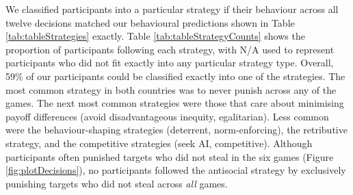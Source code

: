\documentclass[
  man,floatsintext]{apa6}
\begin{document}
We classified participants into a particular strategy if their behaviour across
all twelve decisions matched our behavioural predictions shown in Table
\ref{tab:tableStrategies} exactly. Table \ref{tab:tableStrategyCounts} shows
the proportion of participants following each strategy, with N/A used to
represent participants who did not fit exactly into any particular strategy type.
Overall, 59\%
of our participants could be classified exactly into one of the strategies. The
most common strategy in both countries was to never punish across any of the
games. The next most common strategies were those that care about
minimising payoff differences (avoid disadvantageous inequity, egalitarian).
Less common were the behaviour-shaping strategies (deterrent, norm-enforcing),
the retributive strategy, and the competitive strategies (seek AI, competitive).
Although participants often punished targets who did not steal
in the six games (Figure \ref{fig:plotDecisions}), no participants followed the
antisocial strategy by exclusively punishing targets who did not steal across
\emph{all} games.
\end{document}
